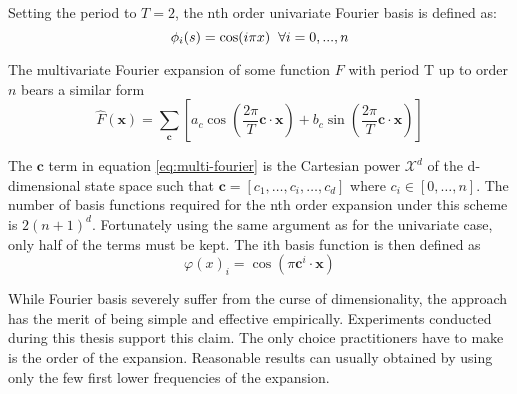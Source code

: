 Setting the period to $T=2$, the nth order univariate Fourier basis is defined as:
\begin{equation}
\phi_i(s) = \cos(i\pi x) \hspace{2mm} \forall i = 0, ..., n
\end{equation}

The multivariate Fourier expansion of some function $F$ with period T up to order $n$
bears a similar form
\begin{equation}
\hat{F}(\mathbf{x}) = \sum_{\mathbf{c}} \left[ a_c \cos \left( \frac{2\pi}{T} \mathbf{c}
\cdot \mathbf{x} \right) +  b_c \sin \left( \frac{2\pi}{T} \mathbf{c} \cdot \mathbf{x}
\right)\right]
\label{eq:multi-fourier}
\end{equation}

The $\mathbf{c}$ term in equation \ref{eq:multi-fourier} is the Cartesian power 
$\mathcal{X}^d$ of the d-dimensional state space such that $\mathbf{c} = [c_1,
\dots, c_i, \dots, c_d]$ where $c_i \in [0, \dots, n]$. The number of basis functions
required for the nth order expansion under this scheme is $2(n+1)^d$.
Fortunately using the same argument as for the univariate case, only half of the terms
must be kept. The ith basis function is then defined as
\begin{equation}
\varphi(x)_i = \cos \left(  \pi \mathbf{c}^i \cdot \mathbf{x} \right)
\end{equation}

While Fourier basis severely suffer from the curse of dimensionality, the approach has
the merit of being simple and effective empirically.  Experiments conducted during this
thesis support this claim. The only choice practitioners have to make is the
order of the expansion. Reasonable results can usually obtained by using only the
few first lower frequencies of the expansion.
